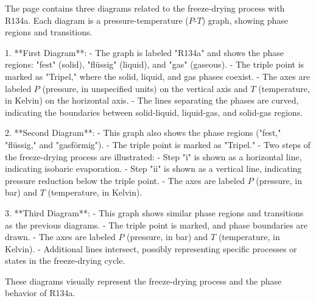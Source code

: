 The page contains three diagrams related to the freeze-drying process with R134a. Each diagram is a pressure-temperature (\( P \)-\( T \)) graph, showing phase regions and transitions.  

1. **First Diagram**:  
   - The graph is labeled "R134a" and shows the phase regions: "fest" (solid), "flüssig" (liquid), and "gas" (gaseous).  
   - The triple point is marked as "Tripel," where the solid, liquid, and gas phases coexist.  
   - The axes are labeled \( P \) (pressure, in unspecified units) on the vertical axis and \( T \) (temperature, in Kelvin) on the horizontal axis.  
   - The lines separating the phases are curved, indicating the boundaries between solid-liquid, liquid-gas, and solid-gas regions.  

2. **Second Diagram**:  
   - This graph also shows the phase regions ("fest," "flüssig," and "gasförmig").  
   - The triple point is marked as "Tripel."  
   - Two steps of the freeze-drying process are illustrated:  
     - Step "i" is shown as a horizontal line, indicating isobaric evaporation.  
     - Step "ii" is shown as a vertical line, indicating pressure reduction below the triple point.  
   - The axes are labeled \( P \) (pressure, in bar) and \( T \) (temperature, in Kelvin).  

3. **Third Diagram**:  
   - This graph shows similar phase regions and transitions as the previous diagrams.  
   - The triple point is marked, and phase boundaries are drawn.  
   - The axes are labeled \( P \) (pressure, in bar) and \( T \) (temperature, in Kelvin).  
   - Additional lines intersect, possibly representing specific processes or states in the freeze-drying cycle.  

These diagrams visually represent the freeze-drying process and the phase behavior of R134a.
